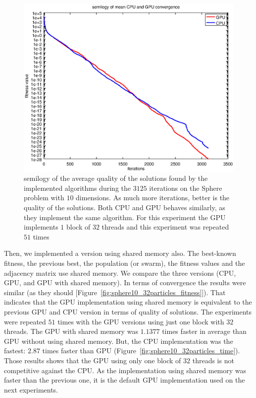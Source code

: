 \documentclass{article}
\begin{document}
    \begin{figure}[!htb]
        \centering
        \includegraphics[width=.7\textwidth]{../img/semilogy_convergence.eps}
        \caption{semilogy of the average quality of the solutions found by the implemented algorithms during the $3125$ iterations on the Sphere problem with $10$ dimensions. As much more iterations, better is the quality of the solutions. Both CPU and GPU behaves similarly, as they implement the same algorithm. For this experiment the GPU implements $1$ block of $32$ threads and this experiment was repeated $51$ times}
        \label{fig:semilogy_convergence}
    \end{figure}

    Then, we implemented a version using shared memory also.
    The best-known fitness, the previous best, the population (or swarm), the fitness values and the adjacency matrix use shared memory.
    We compare the three versions (CPU, GPU, and GPU with shared memory). In terms of convergence the results were similar (as they should [Figure~\ref{fig:sphere10_32particles_fitness}]).
    That indicates that the GPU implementation using shared memory is equivalent to the previous GPU and CPU version in terms of quality of solutions.
    The experiments were repeated $51$ times with the GPU versions using just one block with $32$ threads. The GPU with shared memory was $1.1377$ times faster in average than GPU without using shared memory. But, the CPU implementation was the fastest: $2.87$ times faster than GPU (Figure~\ref{fig:sphere10_32particles_time}).
    Those results shows that the GPU using only one block of $32$ threads is not competitive against the CPU. As the implementation using shared memory was faster than the previous one, it is the default GPU implementation used on the next experiments.
\end{document}
